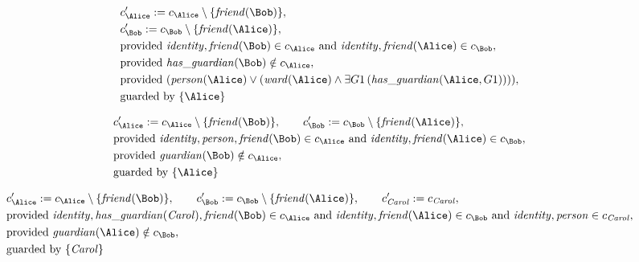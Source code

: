 \begin{align*}
&
c'_
{
\Alice
}
 := 
c_
{
\Alice
}
 \setminus 
\{
\mathit{\detokenize{
friend
}}
(
\Bob
)
\}
,\\
&
c'_
{
\Bob
}
 := 
c_
{
\Bob
}
 \setminus 
\{
\mathit{\detokenize{
friend
}}
(
\Alice
)
\}
,\\
&
\text{provided } 
\mathit{\detokenize{
identity
}}
,
\mathit{\detokenize{
friend
}}
(
\Bob
)
 \in c_
{
\Alice
}
 \text{ and } 
\mathit{\detokenize{
identity
}}
,
\mathit{\detokenize{
friend
}}
(
\Alice
)
 \in c_
{
\Bob
}
,\\
&
\text{provided } 
\mathit{\detokenize{
has_guardian
}}
(
\Bob
)
 \notin c_
{
\Alice
}
,\\
&
\text{provided } 
(
\mathit{\detokenize{
person
}}
(
\Alice
)
\lor
(
\mathit{\detokenize{
ward
}}
(
\Alice
)
\land
\exists 
G1
\,(
\mathit{\detokenize{
has_guardian
}}
(
\Alice
,
G1
)
)
)
)
,\\
&
\text{guarded by } \{
\Alice
\}
\end{align*}

\begin{align*}
&
c'_
{
\Alice
}
 := 
c_
{
\Alice
}
 \setminus 
\{
\mathit{\detokenize{
friend
}}
(
\Bob
)
\}
, \qquad 
c'_
{
\Bob
}
 := 
c_
{
\Bob
}
 \setminus 
\{
\mathit{\detokenize{
friend
}}
(
\Alice
)
\}
,\\
&
\text{provided } 
\mathit{\detokenize{
identity
}}
,
\mathit{\detokenize{
person
}}
,
\mathit{\detokenize{
friend
}}
(
\Bob
)
 \in c_
{
\Alice
}
 \text{ and } 
\mathit{\detokenize{
identity
}}
,
\mathit{\detokenize{
friend
}}
(
\Alice
)
 \in c_
{
\Bob
}
,\\
&
\text{provided } 
\mathit{\detokenize{
guardian
}}
(
\Bob
)
 \notin c_
{
\Alice
}
,\\
&
\text{guarded by } \{
\Alice
\}
\end{align*}

\begin{align*}
&
c'_
{
\Alice
}
 := 
c_
{
\Alice
}
 \setminus 
\{
\mathit{\detokenize{
friend
}}
(
\Bob
)
\}
, \qquad 
c'_
{
\Bob
}
 := 
c_
{
\Bob
}
 \setminus 
\{
\mathit{\detokenize{
friend
}}
(
\Alice
)
\}
, \qquad 
c'_
{
\mathit{Carol}
}
 := 
c_
{
\mathit{Carol}
}
,\\
&
\text{provided } 
\mathit{\detokenize{
identity
}}
,
\mathit{\detokenize{
has_guardian
}}
(
\mathit{Carol}
)
,
\mathit{\detokenize{
friend
}}
(
\Bob
)
 \in c_
{
\Alice
}
 \text{ and } 
\mathit{\detokenize{
identity
}}
,
\mathit{\detokenize{
friend
}}
(
\Alice
)
 \in c_
{
\Bob
}
 \text{ and } 
\mathit{\detokenize{
identity
}}
,
\mathit{\detokenize{
person
}}
 \in c_
{
\mathit{Carol}
}
,\\
&
\text{provided } 
\mathit{\detokenize{
guardian
}}
(
\Alice
)
 \notin c_
{
\Bob
}
,\\
&
\text{guarded by } \{
\mathit{Carol}
\}
\end{align*}
